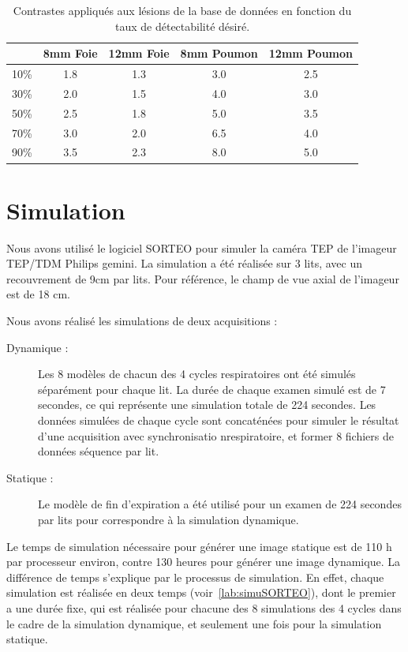 \begin{table}

\centering

\begin{tabular}{|c||c|c||c|c|}
 \hline
	& 8mm Foie	& 12mm Foie	& 8mm Poumon	& 12mm Poumon	\\
\hline
10\%	& 1.8		& 1.3		& 3.0		& 2.5		\\
\hline
30\%	& 2.0		& 1.5		& 4.0		& 3.0		\\
\hline
50\%	& 2.5		& 1.8		& 5.0		& 3.5		\\
\hline
70\%	& 3.0		& 2.0		& 6.5		& 4.0		\\
\hline
90\%	& 3.5		& 2.3		& 8.0		& 5.0		\\
\hline
\end{tabular}
\caption[Contraste final lésions du foie et du poumon]{Contrastes appliqués aux lésions de la base de données en fonction du taux de détectabilité désiré.}
\label{tab:contrasteFoieFinal}
\end{table}

\section{Simulation}

Nous avons utilisé le logiciel SORTEO pour simuler la caméra TEP de l'imageur TEP/TDM Philips gemini. La simulation a été réalisée sur 3 lits, avec un recouvrement de 9cm par lits. Pour référence, le champ de vue axial de l'imageur est de 18 cm.

Nous avons réalisé les simulations de deux acquisitions :
\begin{description}
\item[Dynamique :] Les 8 modèles de chacun des 4 cycles respiratoires ont été simulés séparément pour chaque lit. La durée de chaque examen simulé est de 7 secondes, ce qui représente une simulation totale de 224 secondes. Les données simulées de chaque cycle sont concaténées pour simuler le résultat d'une acquisition avec synchronisatio nrespiratoire, et former 8 fichiers de données séquence par lit.
\item[Statique :] Le modèle de fin d'expiration a été utilisé pour un examen de 224 secondes par lits pour correspondre à la simulation dynamique.
\end{description}

Le temps de simulation nécessaire pour générer une image statique est de 110 h par processeur environ, contre 130 heures pour générer une image dynamique. La différence de temps s'explique par le processus de simulation. En effet, chaque simulation est réalisée en deux temps (voir~\ref{lab:simuSORTEO}), dont le premier a une durée fixe, qui est réalisée pour chacune des 8 simulations des 4 cycles dans le cadre de la simulation dynamique, et seulement une fois pour la simulation statique.

